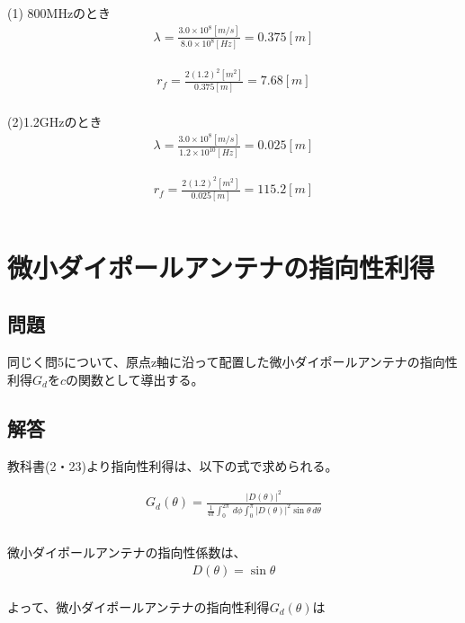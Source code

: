 \documentclass[dvipdfmx,autodetect-engine,titlepage]{jsarticle}
\begin{document}
(1) 800MHzのとき
\begin{eqnarray*}
  \lambda = \frac{3.0 \times  10^8 [m/s]}{8.0 \times  10^8 [Hz]}
  = 0.375 [m]
\end{eqnarray*}

\begin{eqnarray*}
  r_f = \frac{2(1.2)^2[m^2]}{0.375[m]}
  = 7.68[m]\\
\end{eqnarray*}

(2)1.2GHzのとき
\begin{eqnarray*}
  \lambda = \frac{3.0 \times  10^8 [m/s]}{1.2 \times 10^10[Hz]}
  =0.025[m]
\end{eqnarray*}

\begin{eqnarray*}
  r_f = \frac{2(1.2)^2[m^2]}{0.025[m]}
  =115.2[m]\\\\
\end{eqnarray*}

\section{微小ダイポールアンテナの指向性利得}
\subsection{問題}
同じく問5について、原点z軸に沿って配置した微小ダイポールアンテナの指向性利得\begin{math}
  G_dをc
\end{math}の関数として導出する。

\subsection{解答}
教科書(2・23)より指向性利得は、以下の式で求められる。

\begin{eqnarray*}
  G_d(\theta) = \frac{{| D(\theta) \vert }^2}{\frac{1}{4\pi} \int_{0}^{2\pi}  \,d\phi \int_{0}^{\pi} {| D(\theta) \vert }^2 \sin\theta \,d\theta } \\\\
\end{eqnarray*}

微小ダイポールアンテナの指向性係数は、
\begin{eqnarray*}
  D(\theta) = \sin\theta \\
\end{eqnarray*}

よって、微小ダイポールアンテナの指向性利得\begin{math}
  G_d(\theta)
\end{math}は
\end{document}
